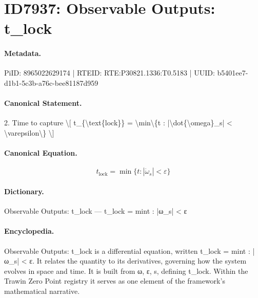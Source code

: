 \section*{ID7937: Observable Outputs: t\_lock}
\paragraph{Metadata.}
PiID: 8965022629174 | RTEID: RTE:P30821.1336:T0.5183 | UUID: b5401ee7-d1b1-5c3b-a76c-bee81187d959

\paragraph{Canonical Statement.}
2. Time to capture \textbackslash{}[ t\_\{\textbackslash{}text\{lock\}\} = \textbackslash{}min\textbackslash{}\{t : |\textbackslash{}dot\{\textbackslash{}omega\}\_s| < \textbackslash{}varepsilon\textbackslash{}\} \textbackslash{}]

\paragraph{Canonical Equation.}
\[
t_{\text{lock}} = \min\{t : |\dot{\omega}_s| < \varepsilon\}
\]

\paragraph{Dictionary.}
Observable Outputs: t\_lock — t\_lock = mint : |ω\_s| < ε

\paragraph{Encyclopedia.}
Observable Outputs: t\_lock is a differential equation, written t\_lock = mint : |ω\_s| < ε. It relates the quantity to its derivatives, governing how the system evolves in space and time. It is built from ω, ε, s, defining t\_lock. Within the Trawin Zero Point registry it serves as one element of the framework's mathematical narrative.
